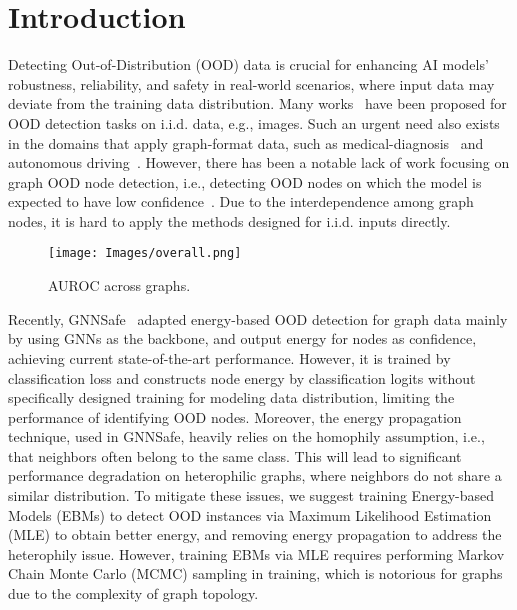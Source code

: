 \section{Introduction}
Detecting Out-of-Distribution (OOD) data is crucial for enhancing AI models' robustness, reliability, and safety in real-world scenarios, where input data may deviate from the training data distribution.
Many works~\citep{hendrycks2016baseline,liang2018enhancing,lee2018simple,hendrycks2018deep,liu2020energy} have been proposed for OOD detection tasks on i.i.d. data, e.g., images. 
Such an urgent need also exists in the domains that apply graph-format data, such as medical-diagnosis~\citep{kukar2003transductive} and autonomous driving~\citep{dai2018dark}. 
However, there has been a notable lack of work focusing on graph OOD node detection, i.e., detecting OOD nodes on which the model is expected to have low confidence~\citep{amodei2016concrete,liang2018enhancing}. Due to the interdependence among graph nodes, it is hard to apply the methods designed for i.i.d. inputs directly. 


\begin{wrapfigure}{R}{0.35\textwidth}
    \centering
    \texttt{[image: Images/overall.png]}
    \vspace{-8pt}
    \caption{AUROC across graphs. 
    }
    \vspace{-8pt}
    \label{fig:overall_auroc}
\end{wrapfigure}


Recently, GNNSafe~\citep{wu2022energy} adapted energy-based OOD detection for graph data mainly by using GNNs as the backbone, and output energy for nodes as confidence, achieving current state-of-the-art performance. 
However, it is trained by classification loss and constructs node energy by classification logits without specifically designed training for modeling data distribution, limiting the performance of identifying OOD nodes. 
Moreover, the energy propagation technique, used in GNNSafe, heavily relies on the homophily assumption, i.e., that neighbors often belong to the same class. This will lead to significant performance degradation on heterophilic graphs, where neighbors do not share a similar distribution. 
To mitigate these issues, we suggest training Energy-based Models (EBMs) to detect OOD instances via Maximum Likelihood Estimation (MLE) to obtain better energy, and removing energy propagation to address the heterophily issue. However, training EBMs via MLE requires performing Markov Chain Monte Carlo (MCMC) sampling in training, which is notorious for graphs due to the complexity of graph topology. 



